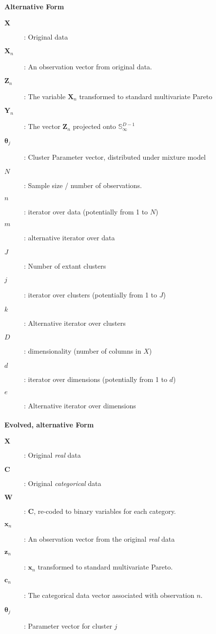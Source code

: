 \documentclass{article}
\begin{document}
\paragraph{Alternative Form}
\begin{description}
\item[$\bm{X}$]: Original data
\item[$\bm{X}_n$]: An observation vector from original data.
\item[$\bm{Z}_n$]: The variable $\bm{X}_n$ transformed to standard multivariate Pareto
\item[$\bm{Y}_n$]: The vector $\bm{Z}_n$ projected onto ${\mathbb S}_{\infty}^{D-1}$
\item[$\bm{\theta}_j$]: Cluster Parameter vector, distributed under mixture model
\item[$N$]: Sample size / number of observations.
\item[$n$]: iterator over data (potentially from 1 to $N$)
\item[$m$]: alternative iterator over data
\item[$J$]: Number of extant clusters
\item[$j$]: iterator over clusters (potentially from 1 to $J$)
\item[$k$]: Alternative iterator over clusters
\item[$D$]: dimensionality (number of columns in $X$)
\item[$d$]: iterator over dimensions (potentially from 1 to $d$)
\item[$e$]: Alternative iterator over dimensions
\end{description}

\paragraph{Evolved, alternative Form}
\begin{description}
\item[$\bm{X}$]: Original \emph{real} data
\item[$\bm{C}$]: Original \emph{categorical} data
\item[$\bm{W}$]: $\bm{C}$, re-coded to binary variables for each category.
\item[$\bm{x}_n$]: An observation vector from the original \emph{real} data
\item[$\bm{z}_n$]: $\bm{x}_n$ transformed to standard multivariate Pareto.
\item[$\bm{c}_n$]: The categorical data vector associated with observation $n$.
\item[$\bm{\theta}_j$]: Parameter vector for cluster $j$
\end{description}
\end{document}
